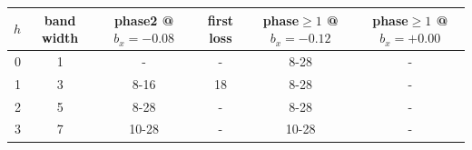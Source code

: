 \begin{tabular}{rccccc}
\toprule
$h$ & band width & phase2 @ $b_x=-0.08$ & first loss & phase$\ge1$ @ $b_x=-0.12$ & phase$\ge1$ @ $b_x=+0.00$ \\
\midrule
0 & 1 & - & - & 8-28 & - \\
1 & 3 & 8-16 & 18 & 8-28 & - \\
2 & 5 & 8-28 & - & 8-28 & - \\
3 & 7 & 10-28 & - & 10-28 & - \\
\bottomrule
\end{tabular}